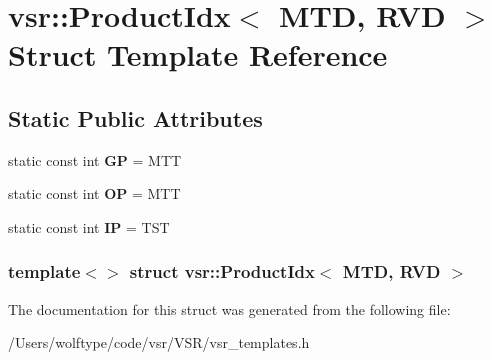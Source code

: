 \hypertarget{structvsr_1_1_product_idx_3_01_m_t_d_00_01_r_v_d_01_4}{\section{vsr\-:\-:Product\-Idx$<$ M\-T\-D, R\-V\-D $>$ Struct Template Reference}
\label{structvsr_1_1_product_idx_3_01_m_t_d_00_01_r_v_d_01_4}
}
\subsection*{Static Public Attributes}
\begin{DoxyCompactItemize}
\item 
\hypertarget{structvsr_1_1_product_idx_3_01_m_t_d_00_01_r_v_d_01_4_aabf45185d865ccdb2f9101bca0df5bce}{static const int {\bfseries G\-P} = M\-T\-T}\label{structvsr_1_1_product_idx_3_01_m_t_d_00_01_r_v_d_01_4_aabf45185d865ccdb2f9101bca0df5bce}

\item 
\hypertarget{structvsr_1_1_product_idx_3_01_m_t_d_00_01_r_v_d_01_4_a27f914f525cad4264bde11355c088c1e}{static const int {\bfseries O\-P} = M\-T\-T}\label{structvsr_1_1_product_idx_3_01_m_t_d_00_01_r_v_d_01_4_a27f914f525cad4264bde11355c088c1e}

\item 
\hypertarget{structvsr_1_1_product_idx_3_01_m_t_d_00_01_r_v_d_01_4_abd7df35aa5e025d2bb0412773ac96089}{static const int {\bfseries I\-P} = T\-S\-T}\label{structvsr_1_1_product_idx_3_01_m_t_d_00_01_r_v_d_01_4_abd7df35aa5e025d2bb0412773ac96089}

\end{DoxyCompactItemize}
\subsubsection*{template$<$$>$ struct vsr\-::\-Product\-Idx$<$ M\-T\-D, R\-V\-D $>$}



The documentation for this struct was generated from the following file\-:\begin{DoxyCompactItemize}
\item 
/\-Users/wolftype/code/vsr/\-V\-S\-R/vsr\-\_\-templates.\-h\end{DoxyCompactItemize}
